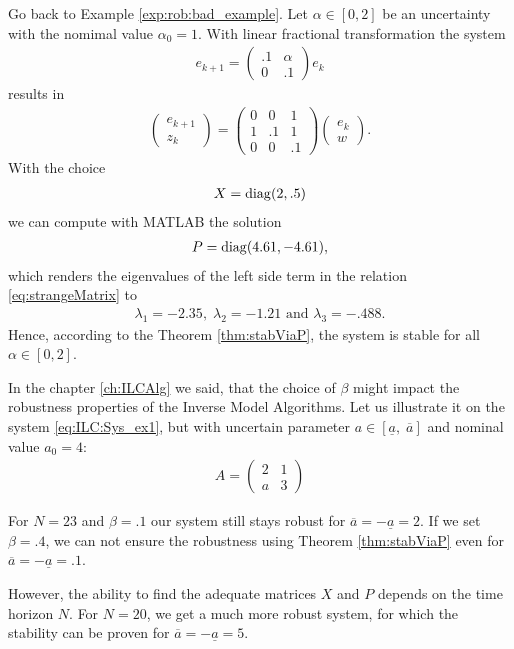 Go back to Example \ref{exp:rob:bad_example}. 
Let $\alpha \in [0,2]$ be an uncertainty with the nomimal value $\alpha_0 = 1$.
With linear fractional transformation the system 
\begin{align}
e_{k+1} = \begin{pmatrix}
.1 & \alpha \\ 0 &.1
\end{pmatrix}e_k
\end{align}
results in 
\begin{align}
\begin{pmatrix}
e_{k+1} \\ z_k
\end{pmatrix} = 
\begin{pmatrix}
0 & 0 & 1 \\
1 & .1 & 1 \\
0 & 0 & .1
\end{pmatrix} \begin{pmatrix}
e_k \\ w
\end{pmatrix}. 
\end{align}
With the choice 
\begin{align}
X = \operatorname*{diag}(2, .5)
\end{align}
we can compute with MATLAB the solution 
\begin{align}
P = \operatorname*{diag}(4.61, -4.61), 
\end{align}
which renders the eigenvalues of the left side term in the relation \eqref{eq:strangeMatrix} to 
\begin{align}
\lambda_1 = -2.35, \; \lambda_2 = -1.21 \text{ and } \lambda_3 = -.488.
\end{align}
Hence, according to the Theorem \ref{thm:stabViaP}, the system is stable for all $\alpha \in [0,2]$. 

\begin{exam}
	\label{ex:Rob:robvsN}
	In the chapter \ref{ch:ILCAlg} we said, that the choice of $\beta$ might impact the robustness properties of the Inverse Model Algorithms.
	Let us illustrate it on the system \eqref{eq:ILC:Sys_ex1}, but with uncertain parameter $a \in [\underline{a}, \; \overline{a}]$ and nominal value $a_0 = 4$: 
	\begin{align}
	A = \begin{pmatrix}
	2 & 1 \\  a & 3
	\end{pmatrix}
	\end{align}
			
	For $N = 23$ and $\beta = .1$ our system still stays robust for $\overline a = - \underline a = 2$. If we set $\beta = .4$, we can not ensure the robustness using Theorem \ref{thm:stabViaP} even for $\overline a = - \underline a = .1$. 
	
	However, the ability to find the adequate matrices $X$ and $P$ depends on the time horizon $N$. 
	For $N = 20$, we get a much more robust system, for which the stability can be proven for $\overline a = - \underline a = 5$. 
\end{exam}


